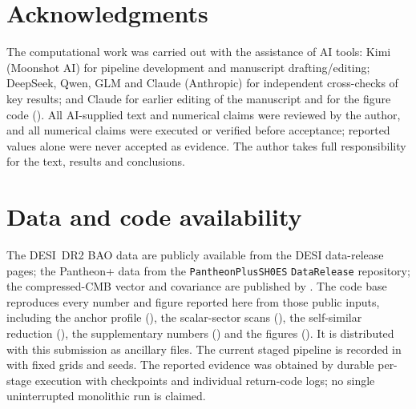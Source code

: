 \section*{Acknowledgments}
The computational work was carried out with the assistance of AI tools: Kimi (Moonshot AI) for pipeline development and manuscript drafting/editing; DeepSeek, Qwen, GLM and Claude (Anthropic) for independent cross-checks of key results; and Claude for earlier editing of the manuscript and for the figure code (). All AI-supplied text and numerical claims were reviewed by the author, and all numerical claims were executed or verified before acceptance; reported values alone were never accepted as evidence. The author takes full responsibility for the text, results and conclusions.

\section*{Data and code availability}
The DESI~DR2 BAO data are publicly available from the DESI data-release pages; the Pantheon+ data from the \texttt{PantheonPlusSH0ES} \texttt{DataRelease} repository; the compressed-CMB vector and covariance are published by \citet{Bansal2025}. The code base  reproduces every number and figure reported here from those public inputs, including the anchor profile (), the scalar-sector scans (), the self-similar reduction (), the supplementary numbers () and the figures (). It is distributed with this submission as ancillary files. The current staged pipeline is recorded in  with fixed grids and seeds. The reported evidence was obtained by durable per-stage execution with checkpoints and individual return-code logs; no single uninterrupted monolithic run is claimed.
